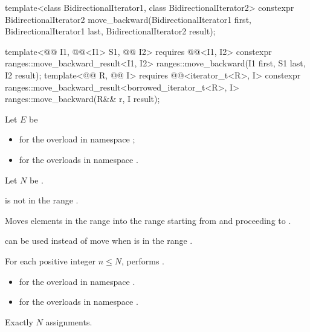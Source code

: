 %
\begin{itemdecl}
template<class BidirectionalIterator1, class BidirectionalIterator2>
  constexpr BidirectionalIterator2
    move_backward(BidirectionalIterator1 first, BidirectionalIterator1 last,
                  BidirectionalIterator2 result);

template<@@ I1, @@<I1> S1, @@ I2>
  requires @@<I1, I2>
  constexpr ranges::move_backward_result<I1, I2>
    ranges::move_backward(I1 first, S1 last, I2 result);
template<@@ R, @@ I>
  requires @@<iterator_t<R>, I>
  constexpr ranges::move_backward_result<borrowed_iterator_t<R>, I>
    ranges::move_backward(R&& r, I result);
\end{itemdecl}

\begin{itemdescr}
\pnum
Let $E$ be
\begin{itemize}
\item
  for the overload in namespace ;
\item
  for the overloads in namespace .
\end{itemize}
Let $N$ be .

\pnum
\expects
{} is not in the range .

\pnum
\effects
Moves elements in the range 
into the range 
starting from  and proceeding to .
\begin{footnote}
 can be used instead of move
when  is in the range .
\end{footnote}
For each positive integer $n \le N$,
performs .

\pnum
\returns
\begin{itemize}
\item
  for the overload in namespace .
\item
  for the overloads in namespace .
\end{itemize}

\pnum
\complexity
Exactly $N$ assignments.
\end{itemdescr}

